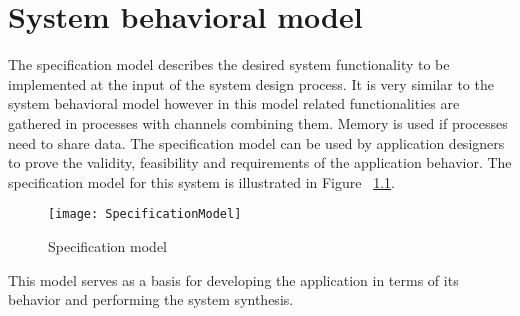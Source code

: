 \chapter{System behavioral model}

The specification model describes the desired system functionality to be implemented at the input of the system design process. It is very similar to the system behavioral model however in this model related functionalities are gathered in processes with channels combining them. Memory is used if processes need to share data. The specification model can be used by application designers to prove the validity, feasibility and requirements of the application behavior.
The specification model for this system is illustrated in Figure ~\ref{fig:SpecificationModel}.

\begin{figure}[H]
\centering
\texttt{[image: SpecificationModel]}
\caption{Specification model}
\label{fig:SpecificationModel}
\end{figure}

This model serves as a basis for developing the application in terms of its behavior and performing the system synthesis.